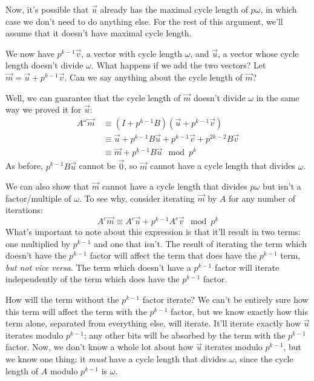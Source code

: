\documentclass[a4paper, reqno, 12pt]{amsart}
\begin{document}
		Now, it's possible that $\vec{u}$ already has the maximal cycle length of $p\omega$, in which case we don't need to do anything else. For the rest of this 
		argument, we'll assume that it doesn't have maximal cycle length.
		
		We now have $p^{k-1}\vec{v}$, a vector with cycle length $\omega$, and $\vec{u}$, a vector whose cycle length doesn't divide $\omega$. What happens if we
		add the two vectors? Let $\vec{m} = \vec{u} + p^{k-1}\vec{v}$. Can we say anything about the cycle length of $\vec{m}$?
		
		Well, we can guarantee that the cycle length of $\vec{m}$ doesn't divide $\omega$ in the same way we proved it for $\vec{u}$:
		\begin{align*}
			A^{\omega}\vec{m} \, &\equiv (I + p^{k-1}B)(\vec{u} + p^{k-1}\vec{v}) \\
			                  \, &\equiv \vec{u} + p^{k-1}B\vec{u} + p^{k-1}\vec{v} + p^{2k-2}B\vec{v} \\
							  \, &\equiv \vec{m} + p^{k-1}B\vec{u} \mod{p^k}
		\end{align*}
		As before, $p^{k-1}B\vec{u}$ cannot be $\vec{0}$, so $\vec{m}$ cannot have a cycle length that divides $\omega$.
		
		We can also show that $\vec{m}$ cannot have a cycle length that divides $p\omega$ but isn't a factor/multiple of $\omega$. To see why, consider iterating
		$\vec{m}$ by $A$ for any number of iterations:
		\[
			A^{c}\vec{m} \equiv A^{c}\vec{u} + p^{k-1}A^{c}\vec{v} \mod{p^k}
		\]
		What's important to note about this expression is that it'll result in two terms: one multiplied by $p^{k-1}$ and one that isn't. The result of iterating the 
		term which doesn't have the $p^{k-1}$ factor will affect the term that does have the $p^{k-1}$ term, \emph{but not vice versa}. The term which doesn't have a
		$p^{k-1}$ factor will iterate independently of the term which does have the $p^{k-1}$ factor.
		
		How will the term without the $p^{k-1}$ factor iterate? We can't be entirely sure how this term will affect the term with the $p^{k-1}$ factor, but we
		know exactly how this term alone, separated from everything else, will iterate. It'll iterate exactly how $\vec{u}$ iterates modulo $p^{k-1}$; any other bits 
		will be absorbed by the term with the $p^{k-1}$ factor. Now, we don't know a whole lot about how $\vec{u}$ iterates modulo $p^{k-1}$, but we know one thing: 
		it \emph{must} have a cycle length that divides $\omega$, since the cycle length of $A$ modulo $p^{k-1}$ is $\omega$.
		
\end{document}
